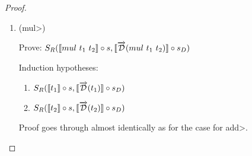 \documentclass[11pt, final]{article}
\begin{document}
\begin{proof}
\begin{enumerate}
      \item (\<mul>)

      Prove: $S_R(\llbracket mul\ t_1\ t_2 \rrbracket \circ s, \llbracket \overrightarrow{\mathcal{D}}(mul\ t_1\ t_2) \rrbracket \circ s_D)$

      Induction hypotheses:
      \begin{enumerate}
        \item \label{eqn:subst_ih_mul1}$S_R(\llbracket t_1 \rrbracket \circ s, \llbracket \overrightarrow{\mathcal{D}}(t_1) \rrbracket \circ s_D)$
        \item \label{eqn:subst_ih_mul2}$S_R(\llbracket t_2 \rrbracket \circ s, \llbracket \overrightarrow{\mathcal{D}}(t_2) \rrbracket \circ s_D)$
      \end{enumerate}

      Proof goes through almost identically as for the case for \<add>.


\end{enumerate}
\end{proof}
\end{document}
